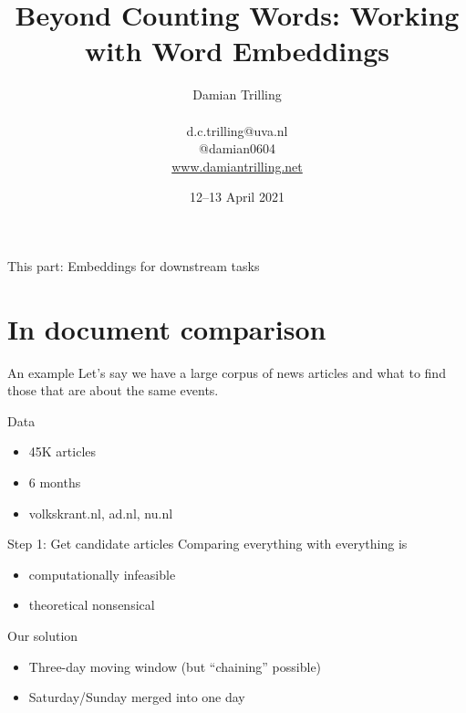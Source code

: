 \documentclass[compress]{beamer}
\title{Beyond Counting Words: Working with Word Embeddings}
\author[Damian Trilling]{Damian Trilling \\ ~ \\ \footnotesize{d.c.trilling@uva.nl \\@damian0604} \\ \url{www.damiantrilling.net}}
\date{12--13 April 2021}
\institute[UvA]{Afdeling Communicatiewetenschap \\Universiteit van Amsterdam}
\begin{document}
\begin{frame}{}
	\titlepage
\end{frame}

\begin{frame}{This part: Embeddings for downstream tasks}
	\tableofcontents
\end{frame}





\section{In document comparison}


\begin{frame}{An example \parencite{Trilling2021}}
	Let's say we have a large corpus of news articles and what to find those that are about the same events.

\end{frame}


\begin{frame}{Data}
	\begin{itemize}
		\item 45K articles
		\item 6 months
		\item volkskrant.nl, ad.nl, nu.nl
	\end{itemize}
\end{frame}



\begin{frame}{Step 1: Get candidate articles}
	Comparing everything with everything is
	\begin{itemize}
		\item computationally infeasible
		\item theoretical nonsensical
	\end{itemize}
	
	\begin{block}{Our solution}
		\begin{itemize}
			\item Three-day moving window (but ``chaining'' possible)
			\item  Saturday/Sunday merged into one day
		\end{itemize}
	\end{block}
	
\end{frame}
\end{document}
